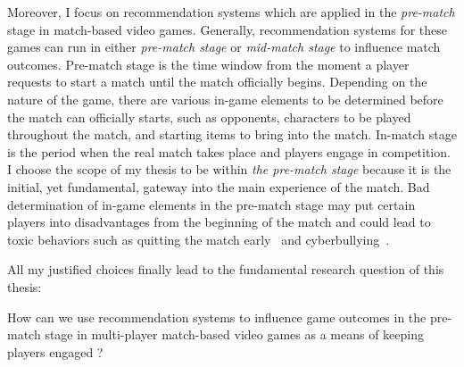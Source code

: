


Moreover, I focus on recommendation systems which are applied in the \textit{pre-match} stage in match-based video games. Generally, recommendation systems for these games can run in either \textit{pre-match stage} or \textit{mid-match stage} to influence match outcomes. Pre-match stage is the time window from the moment a player requests to start a match until the match officially begins. Depending on the nature of the game, there are various in-game elements to be determined before the match can officially starts, such as opponents, characters to be played throughout the match, and starting items to bring into the match. In-match stage is the period when the real match takes place and players engage in competition. I choose the scope of my thesis to be within \textit{the pre-match stage} because it is the initial, yet fundamental, gateway into the main experience of the match. Bad determination of in-game elements in the pre-match stage may put certain players into disadvantages from the beginning of the match and could lead to toxic behaviors such as quitting the match early~\cite{shores2014identification} and cyberbullying~\cite{kwak2015exploring}. 

All my justified choices finally lead to the fundamental research question of this thesis:

\begin{displayquote}
How can we use recommendation systems to influence game outcomes in the pre-match stage in multi-player match-based video games as a means of keeping players engaged ?
\end{displayquote}


